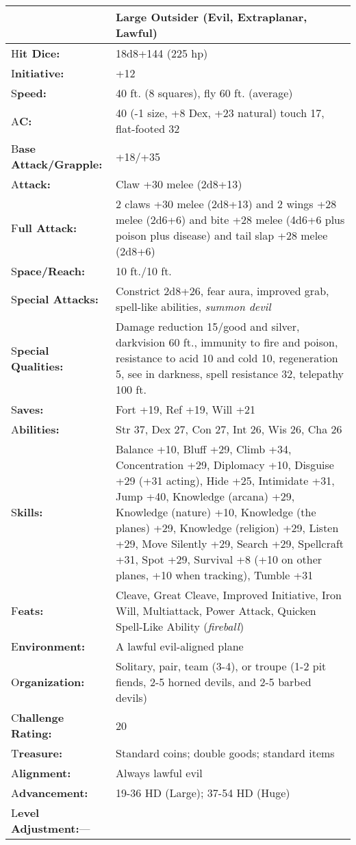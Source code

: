 \documentclass{article}
\begin{document}
\begin{tabular}{|>{\raggedright}p{91pt}|>{\raggedright}p{231pt}|}
\hline
  & Large Outsider (Evil, Extraplanar, Lawful)\tabularnewline
\hline
H\textbf{it Dice:} & 18d8+144 (225 hp)\tabularnewline
\hline
I\textbf{nitiative:} & +12\tabularnewline
\hline
S\textbf{peed:} & 40 ft. (8 squares), fly 60 ft. (average)\tabularnewline
\hline
A\textbf{C:} & 40 (-1 size, +8 Dex, +23 natural) touch 17, flat-footed 32\tabularnewline
\hline
B\textbf{ase Attack/Grapple:} & +18/+35\tabularnewline
\hline
A\textbf{ttack:} & Claw +30 melee (2d8+13)\tabularnewline
\hline
F\textbf{ull Attack:} & 2 claws +30 melee (2d8+13) and 2 wings +28 melee (2d6+6) 
and bite +28 melee (4d6+6 plus poison plus disease) and tail slap +28 melee (2d8+6)\tabularnewline
\hline
S\textbf{pace/Reach:} & 10 ft./10 ft.\tabularnewline
\hline
S\textbf{pecial Attacks:} & Constrict 2d8+26, fear aura, improved grab, spell-like 
abilities, \textit{summon devil}\tabularnewline
\hline
S\textbf{pecial Qualities:} & Damage reduction 15/good and silver, darkvision 60 
ft., immunity to fire and poison, resistance to acid 10 and cold 10, regeneration 
5, see in darkness, spell resistance 32, telepathy 100 ft.\tabularnewline
\hline
S\textbf{aves:} & Fort +19, Ref +19, Will +21\tabularnewline
\hline
A\textbf{bilities:} & Str 37, Dex 27, Con 27, Int 26, Wis 26, Cha 26\tabularnewline
\hline
S\textbf{kills:} & Balance +10, Bluff +29, Climb +34, Concentration +29, Diplomacy 
+10, Disguise +29 (+31 acting), Hide +25, Intimidate +31, Jump +40, Knowledge (arcana) 
+29, Knowledge (nature) +10, Knowledge (the planes) +29, Knowledge (religion) +29, 
Listen +29, Move Silently +29, Search +29, Spellcraft +31, Spot +29, Survival +8 
(+10 on other planes, +10 when tracking), Tumble +31\tabularnewline
\hline
F\textbf{eats:} & Cleave, Great Cleave, Improved Initiative, Iron Will, Multiattack, 
Power Attack, Quicken Spell-Like Ability (\textit{fireball})\tabularnewline
\hline
E\textbf{nvironment:} & A lawful evil-aligned plane\tabularnewline
\hline
O\textbf{rganization:} & Solitary, pair, team (3-4), or troupe (1-2 pit fiends, 
2-5 horned devils, and 2-5 barbed devils)\tabularnewline
\hline
C\textbf{hallenge Rating:} & 20\tabularnewline
\hline
T\textbf{reasure:} & Standard coins; double goods; standard items\tabularnewline
\hline
A\textbf{lignment:} & Always lawful evil\tabularnewline
\hline
A\textbf{dvancement:} & 19-36 HD (Large); 37-54 HD (Huge)\tabularnewline
\hline
L\textbf{evel Adjustment:}--- & \tabularnewline
\hline
\end{tabular}
\end{document}
